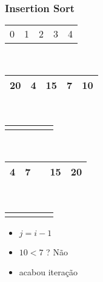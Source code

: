 \documentclass{beamer}
\begin{document}
\begin{frame}
    \frametitle{Insertion Sort}
    \begin{center}
        \begin{table}
            \begin{tabular}{p{0.25cm} p{0.25cm} p{0.25cm} p{0.25cm} p{0.25cm}}
                0 & 1 & 2 & 3 & 4
            \end{tabular} \\
            \begin{tabular}{| p{0.25cm} | p{0.25cm} | p{0.25cm} | p{0.25cm} | p{0.25cm} |}
                \hline
                20 & 4 & 15 & 7 & 10 \\ \hline
            \end{tabular} \\
            \begin{tabular}{p{0.25cm} p{0.25cm} p{0.25cm} p{0.25cm} p{0.25cm}}
                & & & & \color{green}{$\uparrow$}
            \end{tabular} \\
            \begin{tabular}{| p{0.25cm} | p{0.25cm} | p{0.25cm} | p{0.25cm} | p{0.25cm} |}
                \hline
                4 & 7 & & 15 & 20 \\ \hline
            \end{tabular} \\
            \begin{tabular}{p{0.25cm} p{0.25cm} p{0.25cm} p{0.25cm} p{0.25cm}}
                & \color{red}{$\uparrow$} & \color{blue}{$\uparrow$} & &
            \end{tabular}
        \end{table}
	\end{center}
    \color{green}{$ordenando = 10$}
    \begin{itemize}[<+->]
        \item $j = i - 1$
        \item $10 < 7$ ? Não
        \item acabou iteração
    \end{itemize}
\end{frame}
\end{document}
